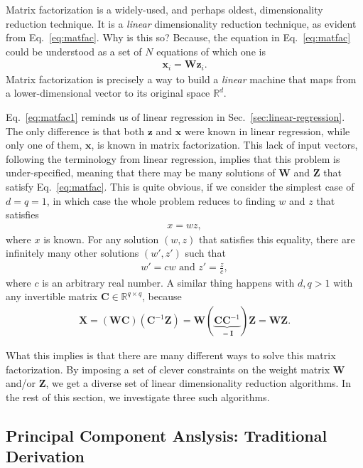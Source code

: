 \documentclass{report}
\newcommand{\vect}[1]{\mathbf{#1}}
\newcommand{\matr}[1]{\mathbf{#1}}
\newcommand{\vx}[0]{\vect{x}}
\newcommand{\vz}[0]{\vect{z}}
\newcommand{\mW}[0]{\matr{W}}
\newcommand{\mZ}[0]{\matr{Z}}
\newcommand{\mX}[0]{\matr{X}}
\newcommand{\mC}{\matr{C}}
\newcommand{\mI}{\matr{I}}
\newcommand{\RR}[0]{\mathbb{R}}
\begin{document}
Matrix factorization is a widely-used, and perhaps oldest, dimensionality
reduction technique. It is a {\it linear} dimensionality reduction technique, as
evident from Eq.~\eqref{eq:matfac}. Why is this so? Because, the equation in
Eq.~\eqref{eq:matfac} could be understood as a set of $N$ equations of which
one is
\begin{align}
    \label{eq:matfac1}
    \vx_i = \mW \vz_i.
\end{align}
Matrix factorization is precisely a way to build a {\it linear} machine that
maps from a lower-dimensional vector to its original space $\RR^d$. 

Eq.~\eqref{eq:matfac1} reminds us of linear regression in
Sec.~\ref{sec:linear-regression}. The only difference is that both $\vz$ and
$\vx$ were known in linear regression, while only one of them, $\vx$, is known
in matrix factorization. This lack of input vectors, following the terminology
from linear regression, implies that this problem is under-specified, meaning
that there may be many solutions of $\mW$ and $\mZ$ that satisfy
Eq.~\eqref{eq:matfac}. This is quite obvious, if we consider the simplest case
of $d=q=1$, in which case the whole problem reduces to finding $w$ and $z$ that
satisfies
\begin{align*}
    x = w z,
\end{align*}
where $x$ is known. For any solution $(w, z)$ that satisfies this equality,
there are infinitely many other solutions $(w', z')$ such that
\begin{align*}
    w' = cw\text{ and }
    z' = \frac{z}{c},
\end{align*}
where $c$ is an arbitrary real number. A similar thing happens with $d, q > 1$
with any invertible matrix $\mC \in \RR^{q \times q}$, because
\begin{align*}
    \mX = (\mW \mC)(\mC^{-1} \mZ) = \mW (\underbrace{\mC \mC^{-1}}_{=\mI}) \mZ = \mW \mZ.
\end{align*}

What this implies is that there are many different ways to solve this matrix
factorization. By imposing a set of clever constraints on the weight matrix
$\mW$ and/or $\mZ$, we get a diverse set of linear dimensionality reduction
algorithms. In the rest of this section, we investigate three such algorithms. 


\subsection{Principal Component Anslysis: Traditional Derivation}
\label{sec:pca}
\end{document}
